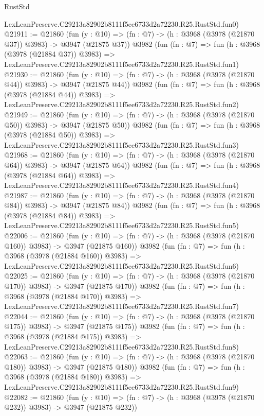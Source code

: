 \begin{lexlean}{RustStd}
\begin{coremodule}
    LexLeanPreserve.C29213a82902b8111f5ee6733d2a72230.R25.RustStd.fun0)
@21911 := @21860
    (fun (y : @10) => (fn : @7) -> (h : @3968 (@3978 (@21870 @37)) @3983) -> @3947 (@21875 @37))
    @3982
    (fun (fn : @7) =>
    fun (h : @3968 (@3978 (@21884 @37)) @3983) =>
    LexLeanPreserve.C29213a82902b8111f5ee6733d2a72230.R25.RustStd.fun1)
@21930 := @21860
    (fun (y : @10) => (fn : @7) -> (h : @3968 (@3978 (@21870 @44)) @3983) -> @3947 (@21875 @44))
    @3982
    (fun (fn : @7) =>
    fun (h : @3968 (@3978 (@21884 @44)) @3983) =>
    LexLeanPreserve.C29213a82902b8111f5ee6733d2a72230.R25.RustStd.fun2)
@21949 := @21860
    (fun (y : @10) => (fn : @7) -> (h : @3968 (@3978 (@21870 @50)) @3983) -> @3947 (@21875 @50))
    @3982
    (fun (fn : @7) =>
    fun (h : @3968 (@3978 (@21884 @50)) @3983) =>
    LexLeanPreserve.C29213a82902b8111f5ee6733d2a72230.R25.RustStd.fun3)
@21968 := @21860
    (fun (y : @10) => (fn : @7) -> (h : @3968 (@3978 (@21870 @64)) @3983) -> @3947 (@21875 @64))
    @3982
    (fun (fn : @7) =>
    fun (h : @3968 (@3978 (@21884 @64)) @3983) =>
    LexLeanPreserve.C29213a82902b8111f5ee6733d2a72230.R25.RustStd.fun4)
@21987 := @21860
    (fun (y : @10) => (fn : @7) -> (h : @3968 (@3978 (@21870 @84)) @3983) -> @3947 (@21875 @84))
    @3982
    (fun (fn : @7) =>
    fun (h : @3968 (@3978 (@21884 @84)) @3983) =>
    LexLeanPreserve.C29213a82902b8111f5ee6733d2a72230.R25.RustStd.fun5)
@22006 := @21860
    (fun (y : @10) => (fn : @7) -> (h : @3968 (@3978 (@21870 @160)) @3983) -> @3947 (@21875 @160))
    @3982
    (fun (fn : @7) =>
    fun (h : @3968 (@3978 (@21884 @160)) @3983) =>
    LexLeanPreserve.C29213a82902b8111f5ee6733d2a72230.R25.RustStd.fun6)
@22025 := @21860
    (fun (y : @10) => (fn : @7) -> (h : @3968 (@3978 (@21870 @170)) @3983) -> @3947 (@21875 @170))
    @3982
    (fun (fn : @7) =>
    fun (h : @3968 (@3978 (@21884 @170)) @3983) =>
    LexLeanPreserve.C29213a82902b8111f5ee6733d2a72230.R25.RustStd.fun7)
@22044 := @21860
    (fun (y : @10) => (fn : @7) -> (h : @3968 (@3978 (@21870 @175)) @3983) -> @3947 (@21875 @175))
    @3982
    (fun (fn : @7) =>
    fun (h : @3968 (@3978 (@21884 @175)) @3983) =>
    LexLeanPreserve.C29213a82902b8111f5ee6733d2a72230.R25.RustStd.fun8)
@22063 := @21860
    (fun (y : @10) => (fn : @7) -> (h : @3968 (@3978 (@21870 @180)) @3983) -> @3947 (@21875 @180))
    @3982
    (fun (fn : @7) =>
    fun (h : @3968 (@3978 (@21884 @180)) @3983) =>
    LexLeanPreserve.C29213a82902b8111f5ee6733d2a72230.R25.RustStd.fun9)
@22082 := @21860
    (fun (y : @10) => (fn : @7) -> (h : @3968 (@3978 (@21870 @232)) @3983) -> @3947 (@21875 @232))

\end{coremodule}
\end{lexlean}
